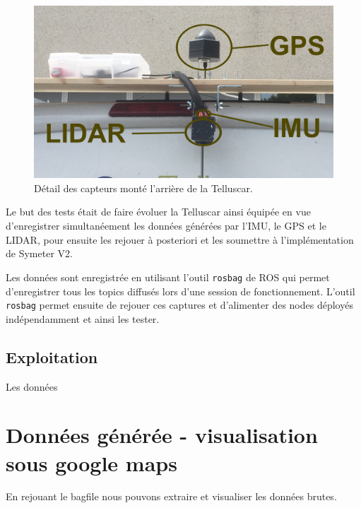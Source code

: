 \documentclass[12pt,a4paper]{report}
\begin{document}
	\begin{figure}[h!]
		\centering
		\includegraphics[width=0.7\linewidth]{img/telluscardetail}
		\caption[telluscardetail]{Détail des capteurs monté l'arrière de la Telluscar.}
		\label{fig:telluscardetail}
	\end{figure}

	\para Le but des tests était de faire évoluer la Telluscar ainsi équipée en vue d'enregistrer simultanéement les données générées par l'IMU, le GPS et le LIDAR, pour ensuite les rejouer à posteriori et les soumettre à l'implémentation de Symeter V2.
	
	\para Les données sont enregistrée en utilisant l'outil \verb|rosbag| de ROS qui permet d'enregistrer tous les topics diffusés lors d'une session de fonctionnement. L'outil \verb|rosbag| permet ensuite de rejouer ces captures et d'alimenter des nodes déployés indépendamment et ainsi les tester.
	
	

	
	\subsection{Exploitation}
	
	Les données 
	
	\section{Données générée - visualisation sous google maps}
	En rejouant le bagfile nous pouvons extraire et visualiser les données brutes.
	
\end{document}
